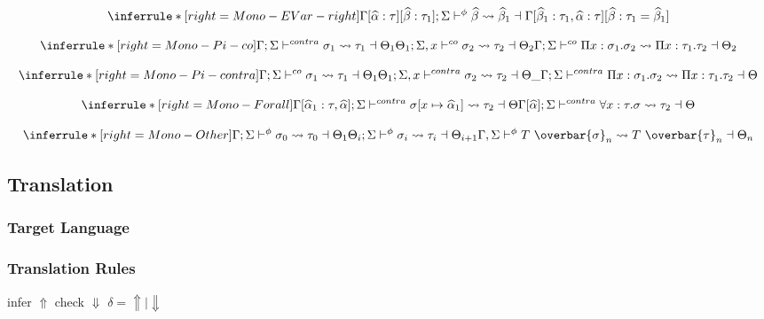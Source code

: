 \[
\inferrule*[right=Mono-EVar-right]
{ }
{\Gamma[\genA:\tau][\genB:\tau_1]; \Sigma \cocontra \genB \bemono \genB_1 \dashv \Gamma[\genB_1:\tau_1, \genA:\tau][\genB :\tau_1= \genB_1]}
\]

\[
\inferrule*[right=Mono-Pi-co]
{\Gamma; \Sigma \contra \sigma_1 \bemono \tau_1 \dashv \Theta_1\\
\Theta_1; \Sigma, x \co \sigma_2 \bemono \tau_2 \dashv \Theta_2
}
{\Gamma; \Sigma \co \Pi x: \sigma_1. \sigma_2 \bemono \Pi x:\tau_1. \tau_2 \dashv \Theta_2}
\]

\[
\inferrule*[right=Mono-Pi-contra]
{
\Gamma; \Sigma \co \sigma_1 \bemono \tau_1 \dashv \Theta_1\\
\Theta_1; \Sigma, x \contra \sigma_2 \bemono \tau_2 \dashv \Theta\_
}
{\Gamma; \Sigma \contra \Pi x: \sigma_1. \sigma_2 \bemono \Pi x:\tau_1. \tau_2 \dashv \Theta}
\]

\[
\inferrule*[right=Mono-Forall]
{\Gamma[\genA_1 : \tau,\genA]; \Sigma \contra \sigma[ x \mapsto \genA_1] \bemono \tau_2 \dashv \Theta}
{\Gamma[\genA]; \Sigma \contra \forall x : \tau. \sigma \bemono \tau_2 \dashv \Theta}
\]

\[
\inferrule*[right=Mono-Other]
{ \Gamma; \Sigma \cocontra \sigma_0 \bemono \tau_0 \dashv \Theta_1\\
\Theta_i; \Sigma \cocontra \sigma_i \bemono \tau_i \dashv \Theta_{i+1}
}
{ \Gamma,\Sigma  \cocontra T~\overbar{\sigma}_n \bemono T~\overbar{\tau}_n \dashv \Theta_n}
\]

\clearpage


\iffalse
\subsection{Translation}

\newcommand{\transto}[1]{\leadsto#1}
\newcommand{\translated}[1]{|#1|}
\newcommand{\cyancolorbox}[1]{\colorbox{cyan!30}{$#1$}}
\newcommand{\invariant}[2]{}

\subsubsection{Target Language}

\gram{\ottE\ottinterrule}

\subsubsection{Translation Rules}

\framebox{$ \infercheck e : \rho \invariant{E}{|\rho|}$ } infer $\Uparrow$ check $\Downarrow$ $\delta = \Uparrow \mid \Downarrow$

